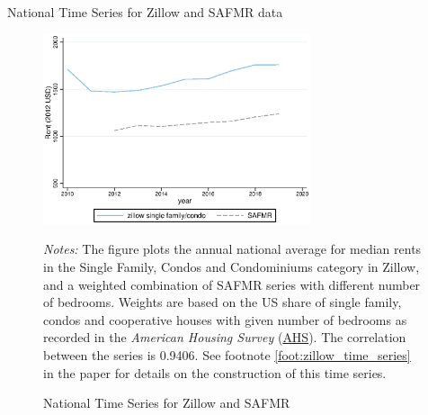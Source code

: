 \documentclass[ignorenonframetext,aspectratio=169]{beamer}
\begin{document}
\begin{frame}{National Time Series for Zillow and SAFMR data}
\protect\hypertarget{national-time-series-for-zillow-and-safmr-data}{}

\begin{figure}[!h]
    \centering
    \caption{National Time Series for Zillow and SAFMR}
    \label{fig:trend_zillow_safmrwgt}
    \includegraphics[width = 0.7\textwidth]{../../analysis/zillow_benchmark/output/trend_zillow_safmrwgt_zipcode_avg.eps}
    \begin{minipage}{0.95\textwidth} \footnotesize
        \vspace{3mm}
        \textit{Notes:} The figure plots the annual national average for median rents in the Single 
        Family, Condos and Condominiums category in Zillow, and a weighted combination of SAFMR series 
        with different number of bedrooms. Weights are based on the US share of single family, 
        condos and cooperative houses with given number of bedrooms as recorded in the \textit{American 
        Housing Survey} (\href{https://www.census.gov/programs-surveys/ahs.html}{AHS}). The correlation
        between the series is 0.9406. %
        See footnote \ref{foot:zillow_time_series} in the paper for details on the construction of this 
        time series.  
    \end{minipage}
\end{figure}

\end{frame}
\end{document}
